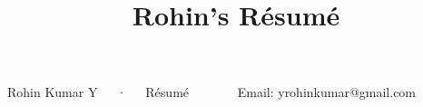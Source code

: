 \documentclass[11pt, a4paper]{awesome-cv}
\title{Rohin's Résumé}
\begin{document}
\makecvheader[L]

\makecvfooter
  {Rohin Kumar Y~~~·~~~Résumé~~~~~~~}
  {Email: {yrohinkumar@gmail.com}}
  {\thepage}


% 






% 


\newpage








%


\end{document}
